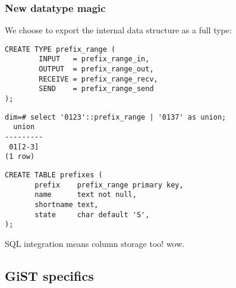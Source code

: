 \documentclass{beamer}
\begin{document}
\begin{frame}[fragile]
  \frametitle{New datatype magic}

  We choose to export the internal data structure as a full type:

  \begin{example}
  \begin{overprint}

  \begin{verbatim}
CREATE TYPE prefix_range (
        INPUT   = prefix_range_in,
        OUTPUT  = prefix_range_out,
        RECEIVE = prefix_range_recv,
        SEND    = prefix_range_send
);
  \end{verbatim}

  \begin{verbatim}
dim=# select '0123'::prefix_range | '0137' as union;
  union
---------
 01[2-3]
(1 row)
  \end{verbatim}

  \begin{verbatim}
CREATE TABLE prefixes (
       prefix    prefix_range primary key,
       name      text not null,
       shortname text,
       state     char default 'S',
);
  \end{verbatim}

  \end{overprint}
  \end{example}
  
   SQL integration means column storage too! \alert{wow}.
\end{frame}

\subsection{GiST specifics}
\end{document}
